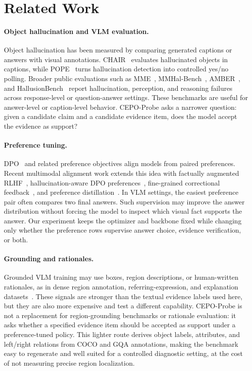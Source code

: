 \documentclass[10pt,twocolumn,letterpaper]{article}
\newcommand{\benchmark}{CEPO-Probe}
\begin{document}
\section{Related Work}

\paragraph{Object hallucination and VLM evaluation.}
Object hallucination has been measured by comparing generated captions or
answers with visual annotations. CHAIR~\cite{chair} evaluates hallucinated
objects in captions, while POPE~\cite{pope} turns hallucination detection into
controlled yes/no polling. Broader public evaluations such as
MME~\cite{mme}, MMHal-Bench~\cite{llavarlhf}, AMBER~\cite{amber}, and
HallusionBench~\cite{hallusionbench} report hallucination, perception, and
reasoning failures across response-level or question-answer settings. These
benchmarks are useful for answer-level or caption-level behavior.
\benchmark{} asks a narrower question: given a candidate claim and a
candidate evidence item, does the model accept the evidence as support?

\paragraph{Preference tuning.}
DPO~\cite{dpo} and related preference objectives align models from paired
preferences. Recent multimodal alignment work extends this idea with
factually augmented RLHF~\cite{llavarlhf}, hallucination-aware DPO
preferences~\cite{hadpo}, fine-grained correctional feedback~\cite{rlhfv}, and
preference distillation~\cite{silkie}. In VLM settings, the easiest preference
pair often compares two final answers. Such supervision may improve the answer
distribution without forcing the model to inspect which visual fact supports
the answer. Our experiment keeps the optimizer and backbone fixed while
changing only whether the preference rows supervise answer choice, evidence
verification, or both.

\paragraph{Grounding and rationales.}
Grounded VLM training may use boxes, region descriptions, or
human-written rationales, as in dense region annotation, referring-expression,
and explanation datasets~\cite{visualgenome,flickr30kentities,referitgame,vqax}.
These signals are stronger than the textual evidence labels used here, but
they are also more expensive and test a different capability. \benchmark{} is
not a replacement for region-grounding benchmarks or rationale evaluation: it
asks whether a specified evidence item should be accepted as support under a
preference-tuned policy. This lighter route derives object labels, attributes,
and left/right relations from COCO and GQA annotations, making the benchmark
easy to regenerate and well suited for a controlled diagnostic setting, at the
cost of not measuring precise region localization.
\end{document}
